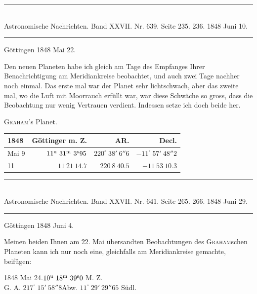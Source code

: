 \clearpage
{}
\begin{center}
\rule{0.55\linewidth}{0.4pt}\\[2pt]
Astronomische Nachrichten. Band XXVII. Nr. 639. Seite 235. 236. 1848 Juni 10.\\[2pt]
\rule{0.55\linewidth}{0.4pt}
\end{center}
\begin{flushright}Göttingen 1848 Mai\raisebox{.35ex}{,} 22.\end{flushright}

Den neuen Planeten habe ich gleich am Tage des Empfanges Ihrer Benachrichtigung am Meridiankreise beobachtet, und auch zwei Tage nachher noch einmal. Das erste mal war der Planet sehr lichtschwach, aber das zweite mal, wo die Luft mit Moorrauch erfüllt war, war diese Schwäche so gross, dass die Beobachtung nur wenig Vertrauen verdient. Indessen setze ich doch beide her.

\begin{center}
\textsc{Graham}'s Planet.\\[3pt]
\setlength{\tabcolsep}{4pt}
\begin{tabular}{l|r|r|r}
1848 & Göttinger m. Z. & AR. & Decl. \\\hline
Mai 9 & $11^{\rm u}\ 31^{\rm m}\ 3^{\rm s}95$ & $220^\circ\ 38'\ 6''6$ & $-11^\circ\ 57'\ 48''2$ \\
\hfill 11 & $11\ 21\ 14.7$ & $220\ 8\ 40.5$ & $-11\ 53\ 10.3$ \\
\end{tabular}
\end{center}

\clearpage
\hypertarget{native-482-june4}{}
\begin{center}
\rule{0.55\linewidth}{0.4pt}\\[2pt]
Astronomische Nachrichten. Band XXVII. Nr. 641. Seite 265. 266. 1848 Juni 29.\\[2pt]
\rule{0.55\linewidth}{0.4pt}
\end{center}
\begin{flushright}Göttingen 1848 Juni 4.\end{flushright}

Meinen beiden Ihnen am 22. Mai übersandten Beobachtungen des \textsc{Graham}schen Planeten kann ich nur noch eine, gleichfalls am Meridiankreise gemachte, beifügen:

\begin{center}
1848 Mai 24.\quad $10^{\rm u}\ 18^{\rm m}\ 39^{\rm s}0$ M. Z.\\
G. A. $217^\circ\ 15'\ 58''8$\qquad Abw. $11^\circ\ 29'\ 29''65$ Südl.
\end{center}

